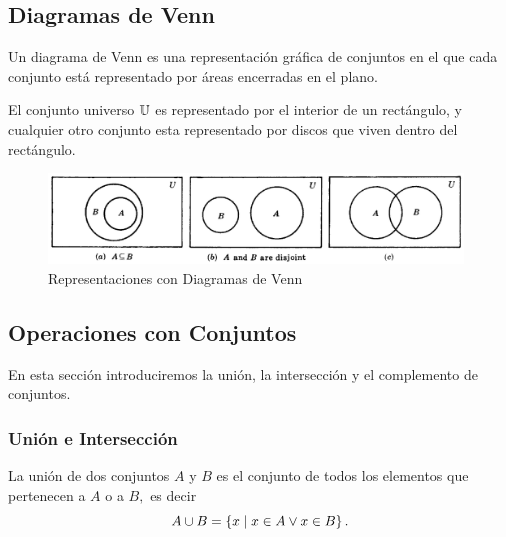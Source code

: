 \documentclass[xcolor={svgnames},
  hyperref={colorlinks}, 
  spanish, 12pt]{beamer}
\numberwithin{equation}{section} %
\numberwithin{figure}{section} %
\begin{document}
\subsection{Diagramas de Venn}

\begin{frame}
 Un diagrama de Venn es una representaci\'on gr\'afica de conjuntos en el que cada conjunto est\'a representado por \'areas encerradas en el plano.
\end{frame}

\begin{frame}
 El conjunto universo $\mathbb{U}$ es representado por el interior de un rect\'angulo, y cualquier otro conjunto esta representado por discos que viven dentro del rect\'angulo.
\end{frame}

\begin{frame}
 \begin{figure}
 \centering
 \includegraphics[width=11cm,keepaspectratio=true]{./venn01.png}
 \caption{Representaciones con Diagramas de Venn}
 \label{fig:0101}
\end{figure}

\end{frame}

\subsection{Operaciones con Conjuntos}

\begin{frame}
 En esta secci\'on introduciremos la uni\'on, la intersecci\'on y el complemento de conjuntos.
\end{frame}

\subsubsection{Uni\'on e Intersecci\'on}

\begin{frame}
 La uni\'on de dos conjuntos $A$ y $B$ es el conjunto de todos los elementos que pertenecen a $A$ o a $B,$ \pause es decir
 $$
 A \cup B = \left\{ x \mid x\in A \vee x\in B \right\}.
 $$
\end{frame}
\end{document}
